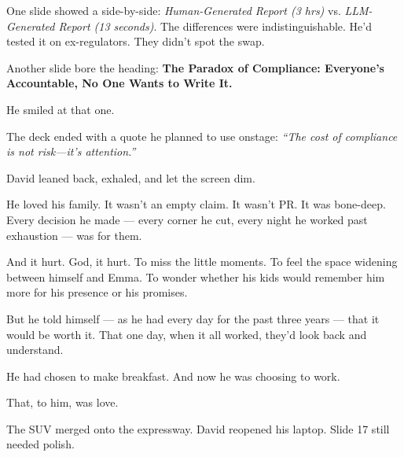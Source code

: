 \medskip

One slide showed a side-by-side:
\textit{Human-Generated Report (3 hrs)} vs. \textit{LLM-Generated Report (13 seconds)}.
The differences were indistinguishable. He’d tested it on ex-regulators. They didn’t spot the swap.

Another slide bore the heading:
\textbf{The Paradox of Compliance: Everyone’s Accountable, No One Wants to Write It.}

He smiled at that one.

The deck ended with a quote he planned to use onstage:
\textit{“The cost of compliance is not risk—it’s attention.”}

David leaned back, exhaled, and let the screen dim.

He loved his family.
It wasn’t an empty claim. It wasn’t PR. It was bone-deep.
Every decision he made — every corner he cut, every night he worked past exhaustion — was for them.

And it hurt. God, it hurt.
To miss the little moments. To feel the space widening between himself and Emma.
To wonder whether his kids would remember him more for his presence or his promises.

But he told himself --- as he had every day for the past three years --- that it would be worth it.
That one day, when it all worked, they’d look back and understand.

He had chosen to make breakfast.
And now he was choosing to work.

That, to him, was love.

The SUV merged onto the expressway.
David reopened his laptop.
Slide 17 still needed polish.